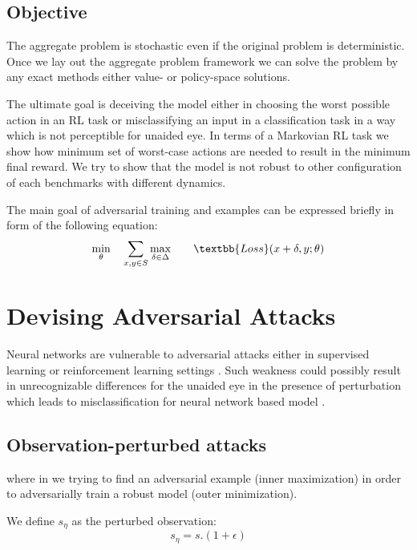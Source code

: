 \documentclass{article}
\begin{document}
    \subsection{Objective}
    The aggregate problem is stochastic even if the original problem is deterministic. Once we lay out the aggregate
    problem framework we can solve the problem by any exact methods either value- or policy-space solutions.


    The ultimate goal is deceiving the model either in choosing the worst possible action in an RL task or misclassifying an input in a classification task in a way which is not perceptible for unaided eye. In terms of a Markovian RL task we show how minimum set of worst-case actions are needed to result in the minimum final reward. We try to show that the model is not robust to other configuration of each benchmarks with different dynamics.

    The main goal of adversarial training and examples can be expressed briefly in form of the following equation:
    \begin{equation}
        \begin{aligned}
            & \underset{\theta}{\min}
            & & \sum_{x,y \in S} \underset{\delta \in \Delta}{\max}
            & & & \textbb{Loss}(x + \delta, y; \theta)
        \end{aligned}
    \end{equation}

    \section{Devising Adversarial Attacks}
    Neural networks are vulnerable to adversarial attacks either in supervised learning or reinforcement learning settings \cite{Huang2017}. Such weakness could possibly result in unrecognizable differences for the unaided eye in the presence of perturbation which leads to misclassification for neural network based model \cite{Szegedy2014, Goodfellow2014}.


    \subsection{Observation-perturbed attacks}


    where in we trying to find an adversarial example (inner maximization) in order to adversarially train a robust model (outer minimization).

    We define $s_\eta$ as the perturbed observation:
    \begin{equation}
        s_\eta = s . (1 + \epsilon)
    \end{equation}
\end{document}

